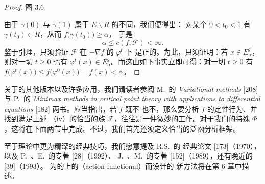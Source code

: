 \begin{proof}
\begin{minipage}{\linewidth}
图 3.6
\end{minipage}

由于 $\gamma(0)$ 与 $\gamma(1)$ 属于 $E\backslash R$ 的不同\trConnectedComponent，我们便得出：%
对某个 $0<t_{0}<1$ 有 $\gamma(t_{0})\in R$，从而 $f\bigl(\gamma(t_{0})\bigr)\geq\alpha$，%
于是
\[
\alpha\leq c(f,\mathcal{F})<\infty.
\]
鉴于\trMinimax{}引理，只须验证 $\mathcal{F}$ 在 $-\nabla f$ 的\trFlow{} $\varphi^{t}$ 下%
是正\trInvariant{}的。为此，只须证明：若 $x\in E^{j}_{\alpha}$，则对一切 $t\geq0$%
也有 $\varphi^{t}(x)\in E^{j}_{\alpha}$。而这由如下事实立即可得：对一切 $t\geq0$ 有%
$f\bigl(\varphi^{t}(x)\bigr)\leq f\bigl(\varphi^{0}(x)\bigr)=f(x)<\alpha$。
\end{proof}

关于\trMountainPassLemma{}的其他版本以及许多应用，我们请读者参阅 M.~\trStruwe{}的%
\emph{Variational methods} [208] 与 P.~\trRabinowitz{}的%
\emph{Minimax methods in critical point theory %
with applications to differential equations} [182] 两书。应当指出，若 $f$ 既不%
\trBoundedAbove{}也不\trBoundedBelow，那么要分析 $f$ 的定性行为、并找到满足上述%
\trEstimate{}（iv）的恰当的族 $\mathcal{F}$，往往是一件微妙的工作。对于我们的特殊%
\trFunctional{} $\Phi$，这将在下面两节中完成。不过，我们首先还须定义恰当的泛函分析框架。

至于\trCriticalPoint{}理论中更为精深的经典技巧，我们愿意提及 R.S.~\trPalais{}的%
经典论文 [173]（1970），以及 P.~\trBlanchard{}、E.~\trBruning{}的专著 [28]（1992）、%
J.~\trMawhin{}、M.~\trWillem{}的专著 [152]（1989），还有晚近的\trChang{} [39]（1993）。%
为\trCompact\trSymplecticManifold{}的\trLoopSpace{}上的\textbf{\trActionFunctional}（action functional）而设计的%
新方法将在第 6 章中描述。
